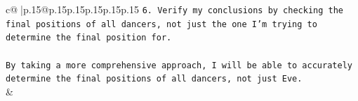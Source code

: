 \documentclass{article}
\begin{document}
{\begin{supertabular}{c@{$\;$}|p{.15\linewidth}@{}p{.15\linewidth}p{.15\linewidth}p{.15\linewidth}p{.15\linewidth}p{.15\linewidth}}
{{{\texttt{6. Verify my conclusions by checking the final positions of all dancers, not just the one I'm trying to determine the final position for.} \\
\\ 
\texttt{By taking a more comprehensive approach, I will be able to accurately determine the final positions of all dancers, not just Eve.} \\
            }
        }
    }
    & \\ \\

\end{supertabular}
}
\end{document}
